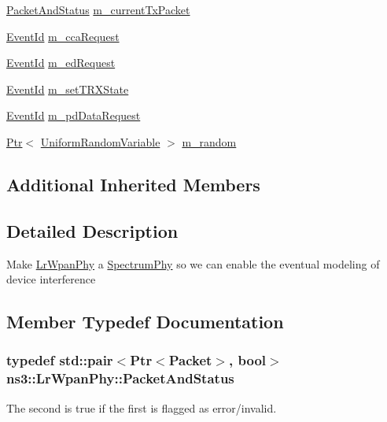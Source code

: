 \begin{DoxyCompactItemize}
\item 
\hyperlink{classns3_1_1LrWpanPhy_a02f7c4a90f352f4089053ad2aed60a4f}{Packet\+And\+Status} \hyperlink{classns3_1_1LrWpanPhy_a695601152abac951fa1958d826813082}{m\+\_\+current\+Tx\+Packet}
\item 
\hyperlink{classns3_1_1EventId}{Event\+Id} \hyperlink{classns3_1_1LrWpanPhy_a5fc2fce788ea008a00078c62682c02d0}{m\+\_\+cca\+Request}
\item 
\hyperlink{classns3_1_1EventId}{Event\+Id} \hyperlink{classns3_1_1LrWpanPhy_a7de5c9c2ff7a6797ef475fb030e99ad0}{m\+\_\+ed\+Request}
\item 
\hyperlink{classns3_1_1EventId}{Event\+Id} \hyperlink{classns3_1_1LrWpanPhy_a0b82e7f96d0225c83489cf3dfb6058ce}{m\+\_\+set\+T\+R\+X\+State}
\item 
\hyperlink{classns3_1_1EventId}{Event\+Id} \hyperlink{classns3_1_1LrWpanPhy_ac25e1b499978dc6ad31f3c425f6e261a}{m\+\_\+pd\+Data\+Request}
\item 
\hyperlink{classns3_1_1Ptr}{Ptr}$<$ \hyperlink{classns3_1_1UniformRandomVariable}{Uniform\+Random\+Variable} $>$ \hyperlink{classns3_1_1LrWpanPhy_a307453e07b607f6ec19530c1042f1eba}{m\+\_\+random}
\end{DoxyCompactItemize}
\subsection*{Additional Inherited Members}


\subsection{Detailed Description}
Make \hyperlink{classns3_1_1LrWpanPhy}{Lr\+Wpan\+Phy} a \hyperlink{classns3_1_1SpectrumPhy}{Spectrum\+Phy} so we can enable the eventual modeling of device interference 

\subsection{Member Typedef Documentation}
\subsubsection[{\texorpdfstring{Packet\+And\+Status}{PacketAndStatus}}]{\setlength{\rightskip}{0pt plus 5cm}typedef std\+::pair$<${\bf Ptr}$<${\bf Packet}$>$, bool$>$ {\bf ns3\+::\+Lr\+Wpan\+Phy\+::\+Packet\+And\+Status}\hspace{0.3cm}{\ttfamily [private]}}\hypertarget{classns3_1_1LrWpanPhy_a02f7c4a90f352f4089053ad2aed60a4f}{}\label{classns3_1_1LrWpanPhy_a02f7c4a90f352f4089053ad2aed60a4f}
The second is true if the first is flagged as error/invalid. 

